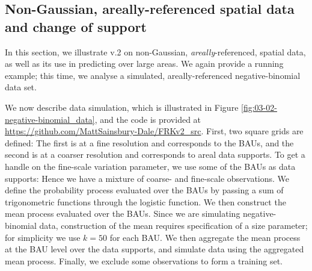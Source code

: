 \documentclass[article]{jss}
\newcommand{\class}[1]{`\code{#1}'}
\begin{document}
\subsection{Non-Gaussian, areally-referenced spatial data and change of support}\label{sec:03-03:negative-binomial}



In this section, we illustrate  v.2 on non-Gaussian, \textit{areally}-referenced, spatial data, as well as its use in predicting over large areas. 
We again provide a running example; this time, we analyse a simulated, areally-referenced negative-binomial data set.

 
We now describe data simulation, which is illustrated in Figure \ref{fig:03-02-negative-binomial_data}, and the code is provided at \url{https://github.com/MattSainsbury-Dale/FRKv2_src}. 
First, two square grids are defined: The first is at a fine resolution and corresponds to the BAUs, and the second is at a coarser resolution and corresponds to areal data supports. 
 To get a handle on the fine-scale variation parameter, we use some of the BAUs as data supports: Hence we have a mixture of coarse- and fine-scale observations. 
We define the probability process evaluated over the BAUs by passing a sum of trigonometric functions through the logistic function. 
We then construct the mean process evaluated over the BAUs. Since we are simulating negative-binomial data, construction of the mean requires specification of a size parameter; for simplicity we use $k = 50$ for each BAU.
We then aggregate the mean process at the BAU level over the data supports, and simulate data using the aggregated mean process. 
Finally, we exclude some observations to form a training set. 
\end{document}
